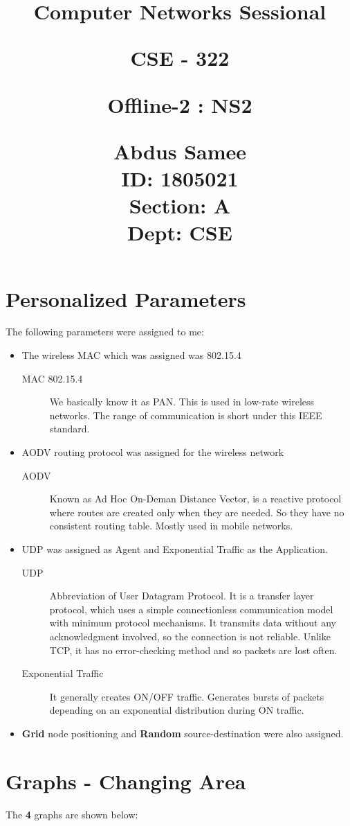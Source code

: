 \documentclass{article}
\title{%
  \begin{center}
        \vspace*{1cm}
            
        \Huge
        \textbf{Computer Networks Sessional}
            
        \vspace{0.5cm}
        \LARGE
        CSE - 322
            
        \vspace{1.5cm}
            
        \textbf{Offline-2 : NS2}
                        
        \vspace{0.8cm}
                        
        \Large
        Abdus Samee\\
        ID: 1805021\\
        Section: A\\
        Dept: CSE\\
    \end{center}
  }
\date{}
\begin{document}
\maketitle
\newpage

\section{Personalized Parameters}
The following parameters were assigned to me:

\begin{itemize}
     \item The wireless MAC which was assigned was 802.15.4
     \begin{description}
         \item[MAC 802.15.4] We basically know it as PAN. This is used in low-rate wireless networks. The range of communication is short under this IEEE standard.
     \end{description}
     \item AODV routing protocol was assigned for the wireless network
     \begin{description}
         \item[AODV] Known as Ad Hoc On-Deman Distance Vector, is a reactive protocol where routes are created only when they are needed. So they have no consistent routing table. Mostly used in mobile networks.
     \end{description}
     \item UDP was assigned as Agent and Exponential Traffic as the Application.
     \begin{description}
         \item[UDP] Abbreviation of User Datagram Protocol. It is a transfer layer protocol, which uses a simple connectionless communication model with minimum protocol mechanisms. It transmits data without any acknowledgment involved, so the connection is not reliable. Unlike TCP, it has no error-checking method and so packets are lost often.
         \item[Exponential Traffic] It generally creates ON/OFF traffic. Generates bursts of packets depending on an exponential distribution during ON traffic. 
     \end{description}
     \item \textbf{Grid} node positioning and \textbf{Random} source-destination were also assigned.
\end{itemize}

\section{Graphs - Changing Area}
The \textbf{4} graphs are shown below:
\end{document}

